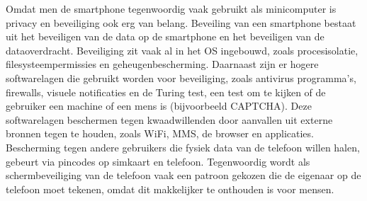 Omdat men de smartphone tegenwoordig vaak gebruikt als minicomputer is privacy en beveiliging ook erg van belang.
Beveiling van een smartphone bestaat uit het beveiligen van de data op de smartphone en het beveiligen van de dataoverdracht.
Beveiliging zit vaak al in het OS ingebouwd, zoals procesisolatie, filesysteempermissies en geheugenbescherming.
Daarnaast zijn er hogere softwarelagen die gebruikt worden voor beveiliging, zoals antivirus programma's, firewalls, visuele notificaties en de Turing test, een test om te kijken of de gebruiker een machine of een mens is (bijvoorbeeld CAPTCHA).
Deze softwarelagen beschermen tegen kwaadwillenden door aanvallen uit externe bronnen tegen te houden, zoals WiFi, MMS, de browser en applicaties.
Bescherming tegen andere gebruikers die fysiek data van de telefoon willen halen, gebeurt via pincodes op simkaart en telefoon.
Tegenwoordig wordt als schermbeveiliging van de telefoon vaak een patroon gekozen die de eigenaar op de telefoon moet tekenen, omdat dit makkelijker te onthouden is voor mensen.
